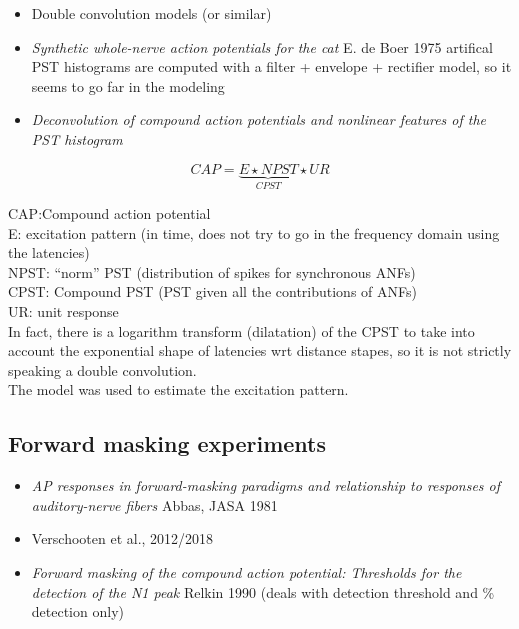 \documentclass[]{article}
\providecommand{\tightlist}{%
  \setlength{\itemsep}{0pt}\setlength{\parskip}{0pt}}
\begin{document}
\clearpage

\begin{itemize}
\tightlist
\item
  Double convolution models (or similar)
\item
  \emph{Synthetic whole-nerve action potentials for the cat} E. de Boer
  1975 artifical PST histograms are computed with a filter + envelope +
  rectifier model, so it seems to go far in the modeling
\item
  \emph{Deconvolution of compound action potentials and nonlinear
  features of the PST histogram} \citep{Bappert1980}
\end{itemize}

\[CAP = \underbrace{E \star NPST}_{CPST} \star UR\]

CAP:Compound action potential\\
E: excitation pattern (in time, does not try to go in the frequency
domain using the latencies)\\
NPST: ``norm'' PST (distribution of spikes for synchronous ANFs)\\
CPST: Compound PST (PST given all the contributions of ANFs)\\
UR: unit response\\
In fact, there is a logarithm transform (dilatation) of the CPST to take
into account the exponential shape of latencies wrt distance stapes, so
it is not strictly speaking a double convolution.\\
The model was used to estimate the excitation pattern.

\subsection{Forward masking
experiments}\label{forward-masking-experiments}

\begin{itemize}
\tightlist
\item
  \emph{AP responses in forward-masking paradigms and relationship to
  responses of auditory-nerve fibers} Abbas, JASA 1981 \citep{Abbas1981}
\item
  Verschooten et al., 2012/2018 \citep{verschooten2012, Verschooten2018}
\item
  \emph{Forward masking of the compound action potential: Thresholds for
  the detection of the N1 peak} Relkin 1990 (deals with detection
  threshold and \% detection only) \citep{Relkin1991}
\end{itemize}
\end{document}
